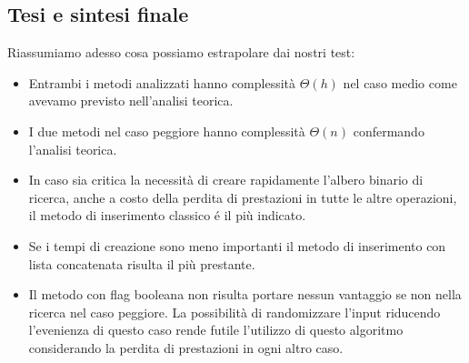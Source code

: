 \subsection{Tesi e sintesi finale}
\label{TesiSintesiFinale_1}
Riassumiamo adesso cosa possiamo estrapolare dai nostri test:
\begin{itemize}
    \item Entrambi i metodi analizzati hanno complessità $\Theta(h)$ nel caso medio come avevamo previsto nell'analisi teorica.
    \item I due metodi nel caso peggiore hanno complessità $\Theta(n)$ confermando l'analisi teorica.
    \item In caso sia critica la necessità di creare rapidamente l'albero binario di ricerca, anche a costo della perdita di prestazioni in tutte le altre operazioni, il metodo di inserimento classico é il più indicato.
    \item Se i tempi di creazione sono meno importanti il metodo di inserimento con lista concatenata risulta il più prestante.
    \item Il metodo con flag booleana non risulta portare nessun vantaggio se non nella ricerca nel caso peggiore. La possibilità di randomizzare l'input riducendo l'evenienza di questo caso rende futile l'utilizzo di questo algoritmo considerando la perdita di prestazioni in ogni altro caso.
   
\end{itemize}



